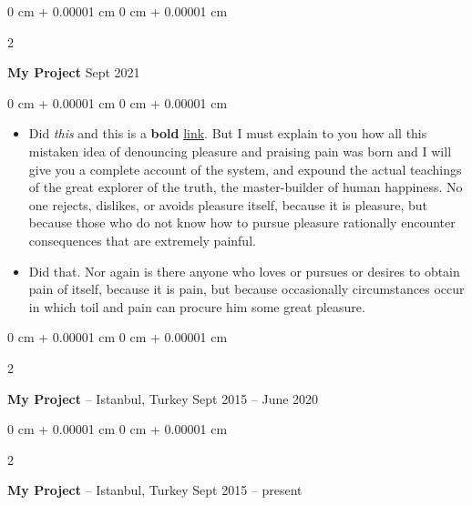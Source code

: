 \documentclass[10pt, letterpaper]{article}
\newenvironment{highlights}{
    \begin{itemize}[
        topsep=0.10 cm,
        parsep=0.10 cm,
        partopsep=0pt,
        itemsep=0pt,
        leftmargin=0 cm + 10pt
    ]
}{
    \end{itemize}
} %
\newenvironment{onecolentry}{
    \begin{adjustwidth}{
        0 cm + 0.00001 cm
    }{
        0 cm + 0.00001 cm
    }
}{
    \end{adjustwidth}
} %
\newenvironment{twocolentry}[2][]{
    \onecolentry
    \def\secondColumn{#2}
    \setcolumnwidth{\fill, 4.5 cm}
    \begin{paracol}{2}
}{
    \switchcolumn \raggedleft \secondColumn
    \end{paracol}
    \endonecolentry
} %
\begin{document}
        \vspace{0.2 cm}

        \begin{twocolentry}{
            Sept 2021
        }
            \textbf{My Project}\end{twocolentry}

        \vspace{0.10 cm}
        \begin{onecolentry}
            \begin{highlights}
                \item Did \textit{this} and this is a \textbf{bold} \href{https://example.com}{link}. But I must explain to you how all this mistaken idea of denouncing pleasure and praising pain was born and I will give you a complete account of the system, and expound the actual teachings of the great explorer of the truth, the master-builder of human happiness. No one rejects, dislikes, or avoids pleasure itself, because it is pleasure, but because those who do not know how to pursue pleasure rationally encounter consequences that are extremely painful.
                \item Did that. Nor again is there anyone who loves or pursues or desires to obtain pain of itself, because it is pain, but because occasionally circumstances occur in which toil and pain can procure him some great pleasure.
            \end{highlights}
        \end{onecolentry}


        \vspace{0.2 cm}

        \begin{twocolentry}{
            Sept 2015 – June 2020
        }
            \textbf{My Project} -- Istanbul, Turkey\end{twocolentry}



        \vspace{0.2 cm}

        \begin{twocolentry}{
            Sept 2015 – present
        }
            \textbf{My Project} -- Istanbul, Turkey\end{twocolentry}
\end{document}
